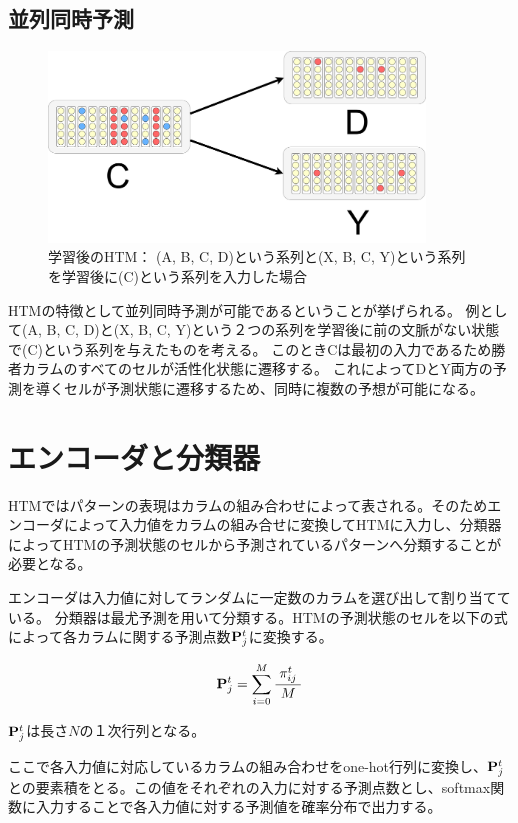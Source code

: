 \newpage
\subsection{並列同時予測}

\begin{figure}[ht]
  \begin{center}
    \includegraphics[width=10cm]{./fig/drawing_8}
    \caption{学習後のHTM： (A, B, C, D)という系列と(X, B, C, Y)という系列を学習後に(C)という系列を入力した場合}
    \label{fig:HTM_parallel_prediction}
  \end{center}
\end{figure}

HTMの特徴として並列同時予測が可能であるということが挙げられる。
例として(A, B, C, D)と(X, B, C, Y)という２つの系列を学習後に前の文脈がない状態で(C)という系列を与えたものを考える。
このときCは最初の入力であるため勝者カラムのすべてのセルが活性化状態に遷移する。
これによってDとY両方の予測を導くセルが予測状態に遷移するため、同時に複数の予想が可能になる。

\newpage
\section{エンコーダと分類器}
HTMではパターンの表現はカラムの組み合わせによって表される。そのためエンコーダによって入力値をカラムの組み合せに変換してHTMに入力し、分類器によってHTMの予測状態のセルから予測されているパターンへ分類することが必要となる。

エンコーダは入力値に対してランダムに一定数のカラムを選び出して割り当てている。
分類器は最尤予測を用いて分類する。HTMの予測状態のセルを以下の式によって各カラムに関する予測点数${\bf P}^t_j$に変換する。

\begin{equation}
  {\bf P}^t_j = \sum^{M}_{i=0} \frac{\pi^t_{ij}}{M}
\end{equation}

${\bf P}^t_j$は長さ$N$の１次行列となる。

ここで各入力値に対応しているカラムの組み合わせをone-hot行列に変換し、${\bf P}^t_j$との要素積をとる。この値をそれぞれの入力に対する予測点数とし、softmax関数に入力することで各入力値に対する予測値を確率分布で出力する。

